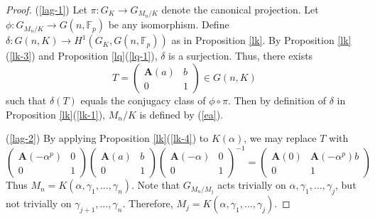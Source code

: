 \documentclass[10pt,a4paper]{amsart}
\numberwithin{equation}{section}
\theoremstyle{plain}
\theoremstyle{definition}
\begin{document}
  \begin{proof}
(\ref{lag-1}) Let $\pi:G_K\to G_{M_n/K}$ denote the canonical projection. Let $\phi:G_{M_n/K}\to G(n,\mathbb{F}_p)$ be any isomorphism. Define $\delta:G(n,K)\to H^1(G_K,G(n,\mathbb{F}_p))$ as in Proposition \ref{lk}. By Proposition \ref{lk}(\ref{lk-3}) and Proposition \ref{lq}(\ref{lq-1}), $\delta$ is a surjection. Thus, there exists
  \begin{equation}
T=\begin{pmatrix}
  \mathbf{A}(a)&b\\
  0&1
\end{pmatrix}
\in G(n,K)
\end{equation}
such that $\delta(T)$ equals the conjugacy class of $\phi\circ\pi$. Then by definition of $\delta$ in Proposition \ref{lk}(\ref{lk-1}), $M_n/K$ is defined by (\ref{ea}).

(\ref{lag-2}) By applying Proposition \ref{lk}(\ref{lk-4}) to $K(\alpha)$, we may replace $T$ with
  \begin{equation}
\begin{pmatrix}
  \mathbf{A}(-\alpha^p)&0\\
  0&1
\end{pmatrix}
\begin{pmatrix}
  \mathbf{A}(a)&b\\
  0&1
\end{pmatrix}
\begin{pmatrix}
  \mathbf{A}(-\alpha)&0\\
  0&1
\end{pmatrix}^{-1}
=\begin{pmatrix}
  \mathbf{A}(0)&\mathbf{A}(-\alpha^p)b\\
  0&1
  \end{pmatrix}
\end{equation}
Thus $M_n=K(\alpha,\gamma_1,\ldots,\gamma_n)$. Note that $G_{M_n/M_j}$ acts trivially on $\alpha,\gamma_1,\ldots,\gamma_j$, but not trivially on $\gamma_{j+1},\ldots,\gamma_n$. Therefore, $M_j=K(\alpha,\gamma_1,\ldots,\gamma_j)$.
  \end{proof}

  
\end{document}
